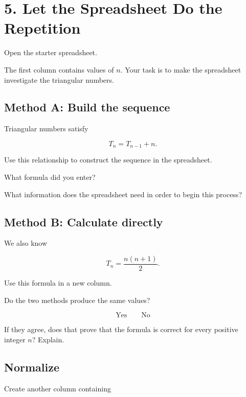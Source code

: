 \documentclass[11pt]{article}
\begin{document}
\newpage
\section{5. Let the Spreadsheet Do the Repetition}

Open the starter spreadsheet.

The first column contains values of \(n\). Your task is to make the
spreadsheet investigate the triangular numbers.


\subsection*{Method A: Build the sequence}

Triangular numbers satisfy

\[
T_n=T_{n-1}+n.
\]

Use this relationship to construct the sequence in the spreadsheet.

What formula did you enter?

\vspace{0.35in}

What information does the spreadsheet need in order to begin this
process?

\vspace{0.35in}


\subsection*{Method B: Calculate directly}

We also know

\[
T_n=\frac{n(n+1)}2.
\]

Use this formula in a new column.

Do the two methods produce the same values?

\[
\boxed{\text{Yes}}
\qquad
\boxed{\text{No}}
\]

If they agree, does that prove that the formula is correct for every
positive integer \(n\)? Explain.

\vspace{0.6in}


\subsection*{Normalize}

Create another column containing
\end{document}
